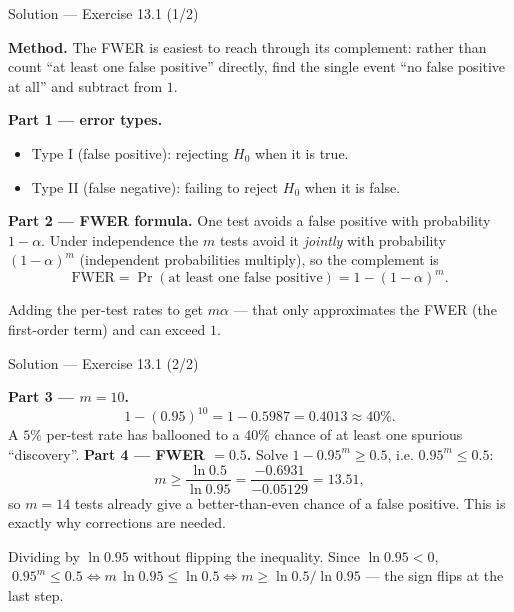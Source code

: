 \documentclass[aspectratio=169,11pt]{beamer}
\begin{document}
\begin{frame}{Solution --- Exercise 13.1 (1/2)}
\begin{solutionbox}
  \textbf{Method.} The FWER is easiest to reach through its complement: rather than
  count ``at least one false positive'' directly, find the single event ``no false
  positive at all'' and subtract from $1$.

  \medskip
  \textbf{Part 1 --- error types.}
  \begin{itemize}
    \item Type I (false positive): rejecting $H_0$ when it is true.
    \item Type II (false negative): failing to reject $H_0$ when it is
          false.
  \end{itemize}
  \medskip
  \textbf{Part 2 --- FWER formula.} One test avoids a false positive with
  probability $1 - \alpha$. Under independence the $m$ tests avoid it
  \emph{jointly} with probability $(1-\alpha)^m$ (independent probabilities
  multiply), so the complement is
  \[
    \mathrm{FWER}=\Pr(\text{at least one false positive})
    = 1 - (1 - \alpha)^m .
  \]
\end{solutionbox}
\begin{mistake}
  Adding the per-test rates to get $m\alpha$ --- that only approximates the FWER
  (the first-order term) and can exceed $1$.
\end{mistake}
\end{frame}

\begin{frame}{Solution --- Exercise 13.1 (2/2)}
\begin{solutionbox}
  \textbf{Part 3 --- $m = 10$.}
  \[
    1 - (0.95)^{10} = 1 - 0.5987 = 0.4013 \approx 40\% .
  \]
  A $5\%$ per-test rate has ballooned to a $40\%$ chance of at least
  one spurious ``discovery''.
  \medskip
  \textbf{Part 4 --- FWER $= 0.5$.} Solve $1 - 0.95^m \ge 0.5$, i.e.
  $0.95^m \le 0.5$:
  \[
    m \ge \frac{\ln 0.5}{\ln 0.95}
        = \frac{-0.6931}{-0.05129} = 13.51 ,
  \]
  so $m = 14$ tests already give a better-than-even chance of a false
  positive. This is exactly why corrections are needed.

\end{solutionbox}
\begin{mistake}
  Dividing by $\ln 0.95$ without flipping the inequality. Since $\ln 0.95<0$,
  $\;0.95^m\le 0.5 \iff m\,\ln 0.95\le \ln 0.5 \iff m\ge \ln 0.5/\ln 0.95$ ---
  the sign flips at the last step.
\end{mistake}
\end{frame}
\end{document}
